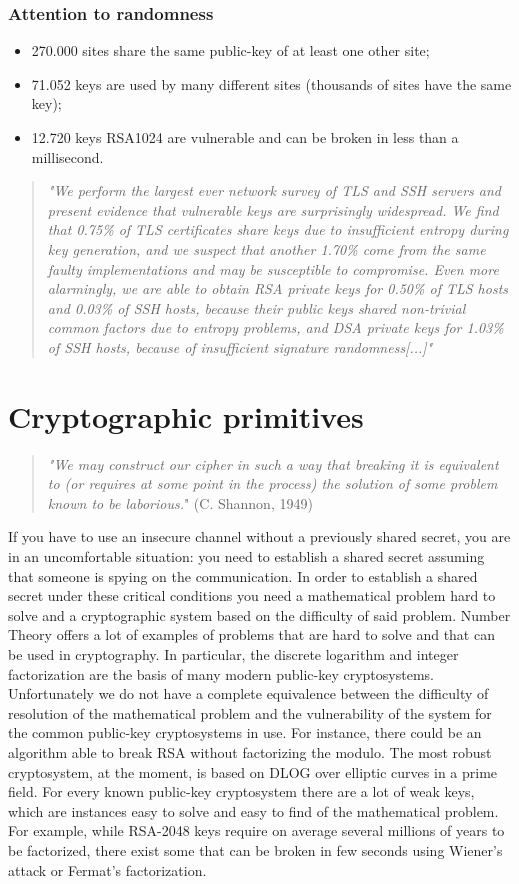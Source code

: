\documentclass[a4paper, 10pt, titlepage]{article}
\begin{document}
\subsubsection*{Attention to randomness}
\begin{itemize}
\item 270.000 sites share the same public-key of at least one other site;
\item 71.052 keys are used by many different sites (thousands of sites have the same key);
\item 12.720 keys RSA1024 are vulnerable and can be broken in less than a millisecond.
\end{itemize}
\begin{quote}
\textit{"We perform the largest ever network survey of TLS and SSH servers and present evidence that vulnerable keys are surprisingly widespread. We find that 0.75\% of TLS certificates share keys due to insufficient entropy during key generation, and we suspect that another 1.70\% come from the same faulty implementations and may be susceptible to compromise. Even more alarmingly, we are able to obtain RSA private keys for 0.50\% of TLS hosts and 0.03\% of SSH hosts, because their public keys shared non-trivial common factors due to entropy problems, and DSA private keys for 1.03\% of SSH hosts, because of insufficient signature randomness[...]"}
\end{quote}

\newpage
\section{Cryptographic primitives}
\begin{quote}
\textit{"We may construct our cipher in such a way that breaking it is equivalent to (or requires at some point in the process) the solution of some problem known to be laborious.}" (C. Shannon, 1949)
\end{quote}
If you have to use an insecure channel without a previously shared secret, you are in an uncomfortable situation: you need to establish a shared secret assuming that someone is spying on the communication.
In order to establish a shared secret under these critical conditions you need a mathematical problem hard to solve and a cryptographic system based on the difficulty of said problem.
Number Theory offers a lot of examples of problems that are hard to solve and that can be used in cryptography. In particular, the discrete logarithm and integer factorization are the basis of many modern public-key cryptosystems.
Unfortunately we do not have a complete equivalence between the difficulty of resolution of the mathematical problem and the vulnerability of the system for the common public-key cryptosystems in use. For instance, there could be an algorithm able to break RSA without factorizing the modulo. The most robust cryptosystem, at the moment, is based on DLOG over elliptic curves in a prime field.
For every known public-key cryptosystem there are a lot of weak keys, which are instances easy to solve and easy to find of the mathematical problem.
For example, while RSA-2048 keys require on average several millions of years to be factorized, there exist some that can be broken in few seconds using Wiener’s attack or Fermat’s factorization.
\end{document}
